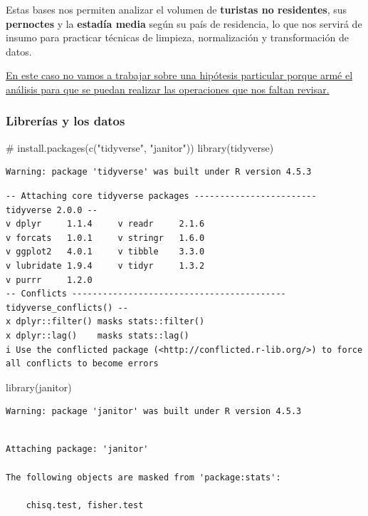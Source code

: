 \documentclass[
  spanish,
  letterpaper,
  DIV=11,
  numbers=noendperiod]{scrartcl}
\newenvironment{Shaded}{\begin{snugshade}}{\end{snugshade}}
\newcommand{\CommentTok}[1]{\textcolor[rgb]{0.37,0.37,0.37}{#1}}
\newcommand{\FunctionTok}[1]{\textcolor[rgb]{0.28,0.35,0.67}{#1}}
\newcommand{\NormalTok}[1]{\textcolor[rgb]{0.00,0.23,0.31}{#1}}
\begin{document}
Estas bases nos permiten analizar el volumen de \textbf{turistas no
residentes}, sus \textbf{pernoctes} y la \textbf{estadía media} según su
país de residencia, lo que nos servirá de insumo para practicar técnicas
de limpieza, normalización y transformación de datos.

\ul{En este caso no vamos a trabajar sobre una hipótesis particular
porque armé el análisis para que se puedan realizar las operaciones que
nos faltan revisar.}

\subsubsection{Librerías y los datos}\label{libreruxedas-y-los-datos}

\begin{Shaded}
\begin{Highlighting}[]
\CommentTok{\# install.packages(c("tidyverse", "janitor"))}
\FunctionTok{library}\NormalTok{(tidyverse)}
\end{Highlighting}
\end{Shaded}

\begin{verbatim}
Warning: package 'tidyverse' was built under R version 4.5.3
\end{verbatim}

\begin{verbatim}
-- Attaching core tidyverse packages ------------------------ tidyverse 2.0.0 --
v dplyr     1.1.4     v readr     2.1.6
v forcats   1.0.1     v stringr   1.6.0
v ggplot2   4.0.1     v tibble    3.3.0
v lubridate 1.9.4     v tidyr     1.3.2
v purrr     1.2.0     
-- Conflicts ------------------------------------------ tidyverse_conflicts() --
x dplyr::filter() masks stats::filter()
x dplyr::lag()    masks stats::lag()
i Use the conflicted package (<http://conflicted.r-lib.org/>) to force all conflicts to become errors
\end{verbatim}

\begin{Shaded}
\begin{Highlighting}[]
\FunctionTok{library}\NormalTok{(janitor)}
\end{Highlighting}
\end{Shaded}

\begin{verbatim}
Warning: package 'janitor' was built under R version 4.5.3
\end{verbatim}

\begin{verbatim}

Attaching package: 'janitor'

The following objects are masked from 'package:stats':

    chisq.test, fisher.test
\end{verbatim}
\end{document}
